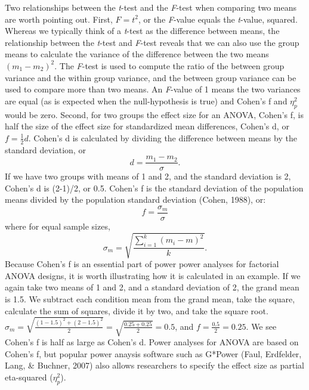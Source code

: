 \documentclass[,jou, draftfirst, a4paper,floatsintext]{apa6}
\begin{document}
Two relationships between the \emph{t}-test and the \emph{F}-test when comparing two means are worth pointing out.
First, \(F = t^2\), or the \emph{F}-value equals the \emph{t}-value, squared.
Whereas we typically think of a \emph{t}-test as the difference between means, the relationship between the \emph{t}-test and \emph{F}-test reveals that we can also use the group means to calculate the variance of the difference between the two means \((m_1 - m_2)^2\).
The \emph{F}-test is used to compute the ratio of the between group variance and the within group variance, and the between group variance can be used to compare more than two means.
An \emph{F}-value of 1 means the two variances are equal (as is expected when the null-hypothesis is true) and Cohen's f and \(\eta_p^2\) would be zero.
Second, for two groups the effect size for an ANOVA, Cohen's f, is half the size of the effect size for standardized mean differences, Cohen's d, or \(f = \frac{1}{2}d\).
Cohen's d is calculated by dividing the difference between means by the standard deviation, or
\begin{equation}
d = \frac{m_1-m_2}{\sigma}.
\end{equation}
If we have two groups with means of 1 and 2, and the standard deviation is 2, Cohen's d is (2-1)/2, or 0.5.
Cohen's f is the standard deviation of the population means divided by the population standard deviation (Cohen, 1988), or:
\begin{equation}
f = \frac{\sigma _{ m }}{\sigma}
\end{equation}
where for equal sample sizes,
\begin{equation}
\sigma _{ m } = \sqrt { \frac { \sum_ { i = 1 } ^ { k } ( m _ { i } - m ) ^ { 2 } } { k } }.
\end{equation}
Because Cohen's f is an essential part of power power analyses for factorial ANOVA designs, it is worth illustrating how it is calculated in an example.
If we again take two means of 1 and 2, and a standard deviation of 2, the grand mean is 1.5.
We subtract each condition mean from the grand mean, take the square, calculate the sum of squares, divide it by two, and take the square root.
\(\sigma_m = \sqrt{\frac{(1-1.5)^2+(2-1.5)^2}{2}} = \sqrt{\frac{0.25+0.25}{2}} = 0.5\), and \(f = \frac{0.5}{2} = 0.25.\)
We see Cohen's f is half as large as Cohen's d.
Power analyses for ANOVA are based on Cohen's f, but popular power anaysis software such as G*Power (Faul, Erdfelder, Lang, \& Buchner, 2007) also allows researchers to specify the effect size as partial eta-squared (\(\eta_p^2\)).
\end{document}
